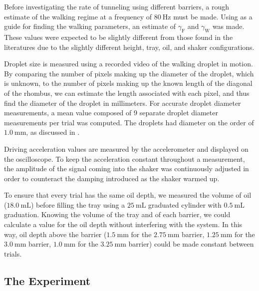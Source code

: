 Before investigating the rate of tunneling using different barriers, a rough estimate of the walking regime at a frequency of $80~\mathrm{Hz}$ must be made. Using  as a guide for finding the walking parameters, an estimate of $\gamma_\mathrm{F}$ and $\gamma_\mathrm{W}$ was made. These values were expected to be slightly different from those found in the literatures due to the slightly different height, tray, oil, and shaker configurations.

Droplet size is measured using a recorded video of the walking droplet in motion. By comparing the number of pixels making up the diameter of the droplet, which is unknown, to the number of pixels making up the known length of the diagonal of the rhombus, we can estimate the length associated with each pixel, and thus find the diameter of the droplet in millimeters. For accurate droplet diameter measurements, a mean value composed of 9 separate  droplet diameter measurements per trial was computed. The droplets had diameter on the order of $1.0~\mathrm{mm}$, as discussed in . 

Driving acceleration values are measured by the accelerometer and displayed on the oscilloscope. To keep the acceleration constant throughout a measurement, the amplitude of the signal coming into the shaker was continuously adjusted in order to counteract the damping introduced as the shaker warmed up.

To ensure that every trial has the same oil depth, we measured the volume of oil ($18.0~\mathrm{mL}$) before filling the tray using a $25~\mathrm{mL}$ graduated cylinder with $0.5~\mathrm{mL}$ graduation. Knowing the volume of the tray and of each barrier, we could calculate a value for the oil depth without interfering with the system. In this way, oil depth above the barrier ($1.5~\mathrm{mm}$ for the $2.75~\mathrm{mm}$ barrier, $1.25~\mathrm{mm}$ for the $3.0~\mathrm{mm}$ barrier, $1.0~\mathrm{mm}$ for the $3.25~\mathrm{mm}$ barrier) could be made constant between trials. 

\subsection{The Experiment}

